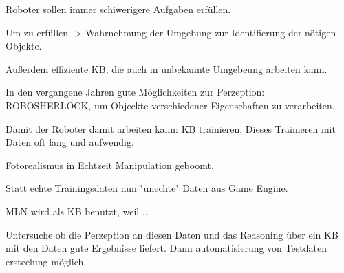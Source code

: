 

Roboter sollen immer schiwerigere Aufgaben erfüllen.

Um zu erfüllen -> Wahrnehmung der Umgebung zur Identifierung der nötigen Objekte.

Außerdem effiziente KB, die auch in unbekannte Umgebeung arbeiten kann. \par

In den vergangene Jahren gute Möglichkeiten zur Perzeption: ROBOSHERLOCK, um Objeckte verschiedener Eigenschaften zu verarbeiten.

Damit der Roboter damit arbeiten kann: KB trainieren.
Dieses Trainieren mit Daten oft lang und aufwendig.

Fotorealismus in Echtzeit Manipulation geboomt.

Statt echte Trainingsdaten nun "unechte" Daten aus Game Engine.

MLN wird als KB benutzt, weil ...

Untersuche ob die Perzeption an diesen Daten und das Reasoning über ein KB mit den Daten gute Ergebnisse liefert. Dann automatisierung von Testdaten ersteelung möglich. 
   

